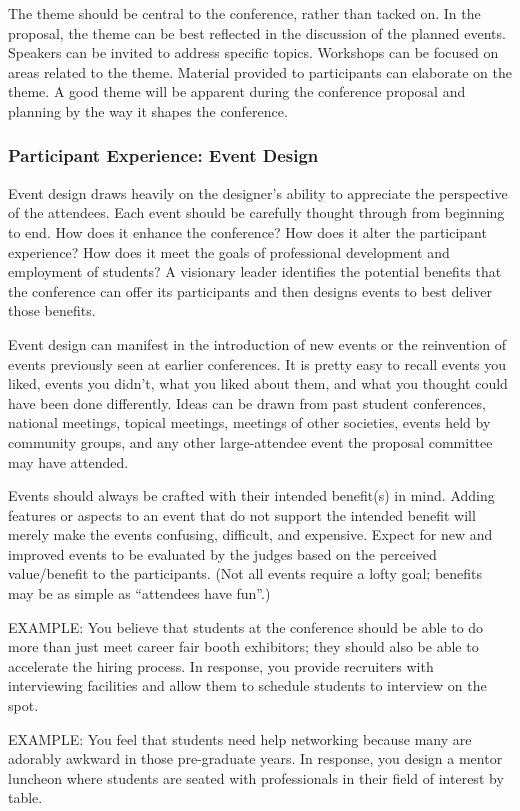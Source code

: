 \documentclass[12pt]{article}
\begin{document}
The theme should be central to the conference, rather than tacked on. In the proposal, the theme can be best reflected in the discussion of the planned events. Speakers can
be invited to address specific topics. Workshops can be focused on areas related to the
theme. Material provided to participants can elaborate on the theme. A good theme will be apparent during the conference proposal and planning by the way it shapes the conference.

\subsubsection{Participant Experience: Event Design}
Event design draws heavily on the designer’s ability to appreciate the perspective of the
attendees. Each event should be carefully thought through from beginning to end. How
does it enhance the conference? How does it alter the participant experience? How does
it meet the goals of professional development and employment of students? A visionary
leader identifies the potential benefits that the conference can offer its participants and
then designs events to best deliver those benefits.

Event design can manifest in the introduction of new events or the reinvention of events
previously seen at earlier conferences. It is pretty easy to recall events you liked, events you didn’t, what you liked about them, and what you thought could have been done
differently. Ideas can be drawn from past student conferences, national meetings, topical
meetings, meetings of other societies, events held by community groups, and any other
large-attendee event the proposal committee may have attended.

Events should always be crafted with their intended benefit(s) in mind. Adding features or aspects to an event that do not support the intended benefit will merely make the events confusing, difficult, and expensive. Expect for new and improved events to be
evaluated by the judges based on the perceived value/benefit to the participants. (Not all events require a lofty goal; benefits may be as simple as “attendees have fun”.)

EXAMPLE: You believe that students at the conference should be able to do more than just meet career fair booth exhibitors; they should also be able to accelerate the hiring process. In response, you provide recruiters with interviewing facilities and allow them to schedule students to interview on the spot.


EXAMPLE: You feel that students need help networking because many are adorably awkward in those pre-graduate years. In response, you design a mentor luncheon where students are seated with professionals in their field of interest by table.
\end{document}
